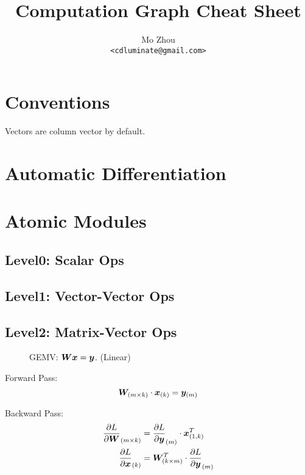 \documentclass[9pt,twocolumn,times]{article}
\title{Computation Graph Cheat Sheet}
\author{Mo Zhou\\\small\texttt{<cdluminate@gmail.com>}}
\begin{document}
\maketitle
\tableofcontents

\section{Conventions}

Vectors are column vector by default.

\section{Automatic Differentiation}

\section{Atomic Modules}

\subsection{Level0: Scalar Ops}

\subsection{Level1: Vector-Vector Ops}

\subsection{Level2: Matrix-Vector Ops}

\begin{figure}[h]
	\centering
	\resizebox{0.618\columnwidth}{!}{%
		
	}
	\caption{GEMV: ${\bm{W}} {\bm{x}} = {\bm{y}}$. (Linear)}
\end{figure}

	Forward Pass:
	\begin{equation}
		{\bm{W}}_{(m\times k)} \cdot {\bm{x}}_{(k)} = {\bm{y}}_{(m)}
	\end{equation}

	Backward Pass:
	\begin{align}
		\frac{\partial L}{\partial{\bm{W}}}_{(m\times k)} &=
		\frac{\partial L}{\partial{\bm{y}}}_{(m)} \cdot {\bm{x}}^T_{(1,k)}\\
		\frac{\partial L}{\partial{\bm{x}}}_{(k)} &=
		{\bm{W}}^T_{(k\times m)} \cdot \frac{\partial L}{\partial {\bm{y}}}_{(m)}
	\end{align}
\end{document}
